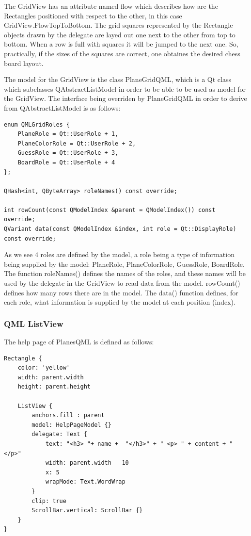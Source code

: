 The GridView has an attribute named flow which describes how are the Rectangles positioned with respect to the other, in this case GridView.FlowTopToBottom. The grid squares represented by the Rectangle objects drawn by the delegate are layed out one next to the other from top to bottom. When a row is full with squares it will be jumped to the next one. So, practically, if the sizes of the squares are correct, one obtaines the desired chess board layout.

The model for the GridView is the class PlaneGridQML, which is a Qt class which subclasses QAbstractListModel in order to be able to be used as model for the GridView. The interface being overriden by PlaneGridQML in order to derive from QAbstractListModel is as follows:

\begin{lstlisting}
enum QMLGridRoles {
	PlaneRole = Qt::UserRole + 1,
	PlaneColorRole = Qt::UserRole + 2,
	GuessRole = Qt::UserRole + 3,
	BoardRole = Qt::UserRole + 4
};

QHash<int, QByteArray> roleNames() const override;

int rowCount(const QModelIndex &parent = QModelIndex()) const override;
QVariant data(const QModelIndex &index, int role = Qt::DisplayRole) const override;
\end{lstlisting}

As we see 4 roles are defined by the model, a role being a type of information being supplied by the model: PlaneRole, PlaneColorRole, GuessRole, BoardRole. The function roleNames() defines the names of the roles, and these names will be used by the delegate in the GridView to read data from the model. rowCount() defines how many rows there are in the model. The data() function defines, for each role, what information is supplied by the model at each position (index).

\subsubsection {QML ListView}

The help page of PlanesQML is defined as follows:

\begin{lstlisting}
Rectangle {
	color: 'yellow'
	width: parent.width
	height: parent.height
	
	ListView {
		anchors.fill : parent 
		model: HelpPageModel {}
		delegate: Text {
			text: "<h3> "+ name +  "</h3>" + " <p> " + content + " </p>"
			width: parent.width - 10
			x: 5
			wrapMode: Text.WordWrap
		}
		clip: true
		ScrollBar.vertical: ScrollBar {}
	}
}
\end{lstlisting}

